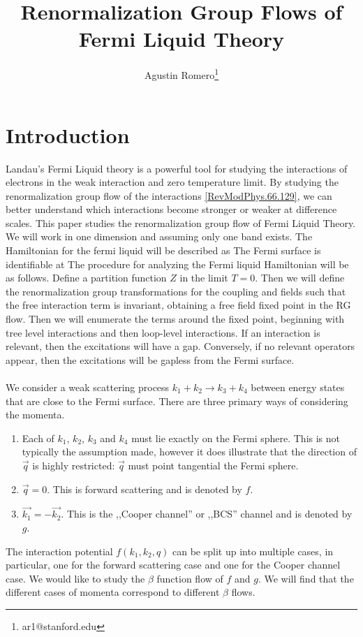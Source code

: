 \documentclass{article}
\title{Renormalization Group Flows of Fermi Liquid Theory}
\author{Agustin Romero\thanks{ar1@stanford.edu}}
\begin{document}
\maketitle
\section{Introduction}
Landau's Fermi Liquid theory is a powerful tool for studying the interactions of electrons in the weak interaction and zero temperature limit. By studying the renormalization group flow of the interactions \ref{RevModPhys.66.129}, we can better understand which interactions become stronger or weaker at difference scales. This paper studies the renormalization group flow of Fermi Liquid Theory. We will work in one dimension and assuming only one band exists. The Hamiltonian for the fermi liquid will be described as
The Fermi surface is identifiable at 
The procedure for analyzing the Fermi liquid Hamiltonian will be as follows. Define a partition function $Z$ in the limit $T=0$. Then we will define the renormalization group transformations for the coupling and fields such that the free interaction term is invariant, obtaining a free field fixed point in the RG flow. Then we will enumerate the terms around the fixed point, beginning with tree level interactions and then loop-level interactions. If an interaction is relevant, then the excitations will have a gap. Conversely, if no relevant operators appear, then the excitations will be gapless from the Fermi surface.\\~\\
We consider a weak scattering process $k_1 + k_2 \rightarrow k_3 + k_4$ between energy states that are close to the Fermi surface. There are three primary ways of considering the momenta. 
\begin{enumerate}
\item Each of $k_1$, $k_2$, $k_3$ and $k_4$ must lie exactly on the Fermi sphere. This is not typically the assumption made, however it does illustrate that the direction of $\vec{q}$ is highly restricted: $\vec{q}$ must point tangential the Fermi sphere.
\item $\vec{q}=0$. This is forward scattering and is denoted by $f$.
\item $\vec{k_1}=-\vec{k_2}$. This is the ,,Cooper channel'' or ,,BCS'' channel and is denoted by $g$.
\end{enumerate}
The interaction potential $f(k_1,k_2,q)$ can be split up into multiple cases, in particular, one for the forward scattering case and one for the Cooper channel case.
We would like to study the $\beta$ function flow of $f$ and $g$. We will find that the different cases of momenta correspond to different $\beta$ flows.
\end{document}
